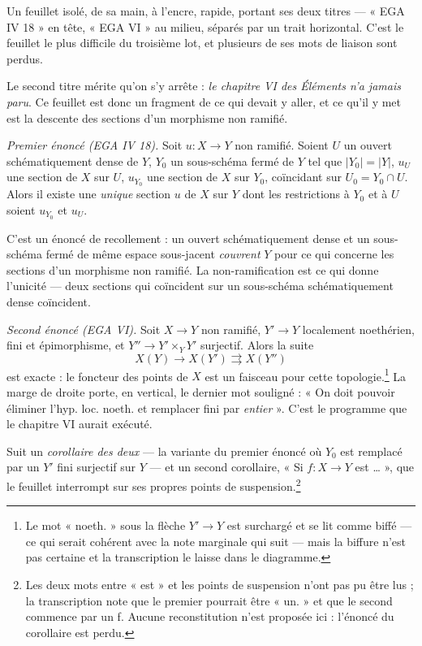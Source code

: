 \documentclass[11pt,a4paper]{article}
\begin{document}
Un feuillet isolé, de sa main, à l'encre, rapide, portant ses deux titres — « EGA
IV 18 » en tête, « EGA VI » au milieu, séparés par un trait horizontal. C'est le
feuillet le plus difficile du troisième lot, et plusieurs de ses mots de liaison
sont perdus.

Le second titre mérite qu'on s'y arrête : \emph{le chapitre VI des Éléments n'a
jamais paru}. Ce feuillet est donc un fragment de ce qui devait y aller, et ce
qu'il y met est la descente des sections d'un morphisme non ramifié.

\emph{Premier énoncé (EGA IV 18).} Soit $u : X \to Y$ non ramifié. Soient $U$ un
ouvert schématiquement dense de $Y$, $Y_{0}$ un sous-schéma fermé de $Y$ tel que
$|Y_{0}| = |Y|$, $u_{U}$ une section de $X$ sur $U$, $u_{Y_{0}}$ une section de
$X$ sur $Y_{0}$, coïncidant sur $U_{0} = Y_{0} \cap U$. Alors il existe une
\emph{unique} section $u$ de $X$ sur $Y$ dont les restrictions à $Y_{0}$ et à
$U$ soient $u_{Y_{0}}$ et $u_{U}$.

C'est un énoncé de recollement : un ouvert schématiquement dense et un
sous-schéma fermé de même espace sous-jacent \emph{couvrent} $Y$ pour ce qui
concerne les sections d'un morphisme non ramifié. La non-ramification est ce qui
donne l'unicité — deux sections qui coïncident sur un sous-schéma
schématiquement dense coïncident.

\emph{Second énoncé (EGA VI).} Soit $X \to Y$ non ramifié, $Y' \to Y$ localement
noethérien, fini et épimorphisme, et $Y'' \to Y' \times_{Y} Y'$ surjectif. Alors
la suite
\[
  X(Y) \longrightarrow X(Y') \rightrightarrows X(Y'')
\]
est exacte : le foncteur des points de $X$ est un faisceau pour cette
topologie.\footnote{Le mot « noeth. » sous la flèche $Y' \to Y$ est surchargé et
se lit comme biffé — ce qui serait cohérent avec la note marginale qui suit —
mais la biffure n'est pas certaine et la transcription le laisse dans le
diagramme.} La marge de droite porte, en vertical, le dernier mot souligné :
« On doit pouvoir éliminer l'hyp. loc. noeth. et remplacer fini par
\emph{entier} ». C'est le programme que le chapitre VI aurait exécuté.

Suit un \emph{corollaire des deux} — la variante du premier énoncé où $Y_{0}$
est remplacé par un $Y'$ fini surjectif sur $Y$ — et un second corollaire, « Si
$f : X \to Y$ est … », que le feuillet interrompt sur ses propres points de
suspension.\footnote{Les deux mots entre « est » et les points de suspension
n'ont pas pu être lus ; la transcription note que le premier pourrait être
« un. » et que le second commence par un f. Aucune reconstitution n'est proposée
ici : l'énoncé du corollaire est perdu.}
\end{document}
